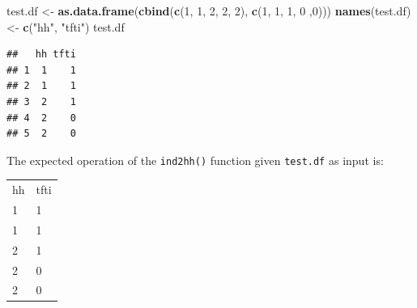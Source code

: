\documentclass[12pt,a4paper]{book}
\newenvironment{Shaded}{\begin{snugshade}}{\end{snugshade}}
\newcommand{\KeywordTok}[1]{\textcolor[rgb]{0.13,0.29,0.53}{\textbf{#1}}}
\newcommand{\DecValTok}[1]{\textcolor[rgb]{0.00,0.00,0.81}{#1}}
\newcommand{\StringTok}[1]{\textcolor[rgb]{0.31,0.60,0.02}{#1}}
\newcommand{\NormalTok}[1]{#1}
\theoremstyle{definition}
\theoremstyle{definition}
\theoremstyle{definition}
\theoremstyle{remark}
\begin{document}
\begin{Shaded}
\begin{Highlighting}[]
\NormalTok{test.df <-}\StringTok{ }\KeywordTok{as.data.frame}\NormalTok{(}\KeywordTok{cbind}\NormalTok{(}\KeywordTok{c}\NormalTok{(}\DecValTok{1}\NormalTok{, }\DecValTok{1}\NormalTok{, }\DecValTok{2}\NormalTok{, }\DecValTok{2}\NormalTok{, }\DecValTok{2}\NormalTok{),  }\KeywordTok{c}\NormalTok{(}\DecValTok{1}\NormalTok{, }\DecValTok{1}\NormalTok{, }\DecValTok{1}\NormalTok{, }\DecValTok{0}\NormalTok{ ,}\DecValTok{0}\NormalTok{)))}
\KeywordTok{names}\NormalTok{(test.df) <-}\StringTok{ }\KeywordTok{c}\NormalTok{(}\StringTok{"hh"}\NormalTok{, }\StringTok{"tfti"}\NormalTok{)}
\NormalTok{test.df}
\end{Highlighting}
\end{Shaded}

\begin{verbatim}
##   hh tfti
## 1  1    1
## 2  1    1
## 3  2    1
## 4  2    0
## 5  2    0
\end{verbatim}

The expected operation of the \texttt{ind2hh()} function given
\texttt{test.df} as input is:

\begin{longtable}[]{@{}ll@{}}
\toprule
\begin{minipage}[t]{0.08\columnwidth}\raggedright
hh\strut
\end{minipage} & \begin{minipage}[t]{0.14\columnwidth}\raggedright
tfti\strut
\end{minipage}\tabularnewline
\begin{minipage}[t]{0.08\columnwidth}\raggedright
1\strut
\end{minipage} & \begin{minipage}[t]{0.14\columnwidth}\raggedright
1\strut
\end{minipage}\tabularnewline
\begin{minipage}[t]{0.08\columnwidth}\raggedright
1\strut
\end{minipage} & \begin{minipage}[t]{0.14\columnwidth}\raggedright
1\strut
\end{minipage}\tabularnewline
\begin{minipage}[t]{0.08\columnwidth}\raggedright
2\strut
\end{minipage} & \begin{minipage}[t]{0.14\columnwidth}\raggedright
1\strut
\end{minipage}\tabularnewline
\begin{minipage}[t]{0.08\columnwidth}\raggedright
2\strut
\end{minipage} & \begin{minipage}[t]{0.14\columnwidth}\raggedright
0\strut
\end{minipage}\tabularnewline
\begin{minipage}[t]{0.08\columnwidth}\raggedright
2\strut
\end{minipage} & \begin{minipage}[t]{0.14\columnwidth}\raggedright
0\strut
\end{minipage}\tabularnewline
\bottomrule
\end{longtable}
\end{document}
